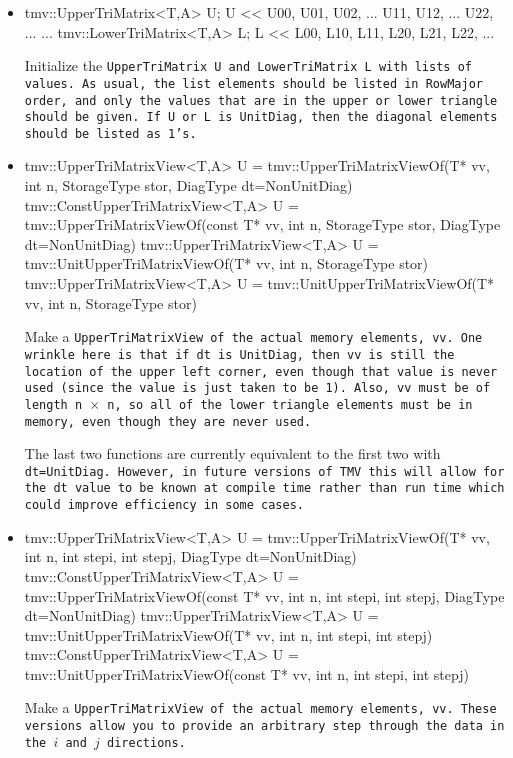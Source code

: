 \begin{itemize}
\vspace{1 in}
\item
\begin{tmvcode}
tmv::UpperTriMatrix<T,A> U;
U << U00, U01, U02, ...
          U11, U12, ...
               U22, ...
                    ...
tmv::LowerTriMatrix<T,A> L;
L << L00,
     L10, L11, 
     L20, L21, L22,
     ...
\end{tmvcode}
Initialize the \tt{UpperTriMatrix U} and \tt{LowerTriMatrix L} with lists of values.  As usual, the 
list elements should be listed in RowMajor order, and only the values that are in the upper or
lower triangle should be given.  If \tt{U} or \tt{L} is \tt{UnitDiag}, then the diagonal elements should be 
listed as 1's.
\item
\begin{tmvcode}
tmv::UpperTriMatrixView<T,A> U = 
      tmv::UpperTriMatrixViewOf(T* vv, int n, 
      StorageType stor, DiagType dt=NonUnitDiag)
tmv::ConstUpperTriMatrixView<T,A> U = 
      tmv::UpperTriMatrixViewOf(const T* vv, int n, 
      StorageType stor, DiagType dt=NonUnitDiag)
tmv::UpperTriMatrixView<T,A> U = 
      tmv::UnitUpperTriMatrixViewOf(T* vv, int n, 
      StorageType stor)
tmv::UpperTriMatrixView<T,A> U = 
      tmv::UnitUpperTriMatrixViewOf(T* vv, int n, 
      StorageType stor)
\end{tmvcode}
Make a \tt{UpperTriMatrixView} of the actual memory elements, \tt{vv}.
One wrinkle here is that if \tt{dt} is \tt{UnitDiag}, then 
\tt{vv} is still the location of the
upper left corner, even though that value is never used 
(since the value is just taken to
be 1).  Also, \tt{vv} must be of length \tt{n} $\times$ \tt{n},
so all of the lower triangle
elements must be in memory, even though they are never used.

The last two functions are currently equivalent to the first two with \tt{dt=UnitDiag}.
However, in future versions of TMV this will allow for the \tt{dt} value to be 
known at compile time rather than run time which could improve efficiency
in some cases.

\item
\begin{tmvcode}
tmv::UpperTriMatrixView<T,A> U = 
      tmv::UpperTriMatrixViewOf(T* vv, int n, 
      int stepi, int stepj, DiagType dt=NonUnitDiag)
tmv::ConstUpperTriMatrixView<T,A> U = 
      tmv::UpperTriMatrixViewOf(const T* vv, int n, 
      int stepi, int stepj, DiagType dt=NonUnitDiag)
tmv::UpperTriMatrixView<T,A> U = 
      tmv::UnitUpperTriMatrixViewOf(T* vv, int n, 
      int stepi, int stepj)
tmv::ConstUpperTriMatrixView<T,A> U = 
      tmv::UnitUpperTriMatrixViewOf(const T* vv, int n, 
      int stepi, int stepj)
\end{tmvcode}
Make a \tt{UpperTriMatrixView} of the actual memory elements, \tt{vv}.
These versions allow you to provide an arbitrary step through the data in 
the $i$ and $j$ directions. 
\end{itemize}

